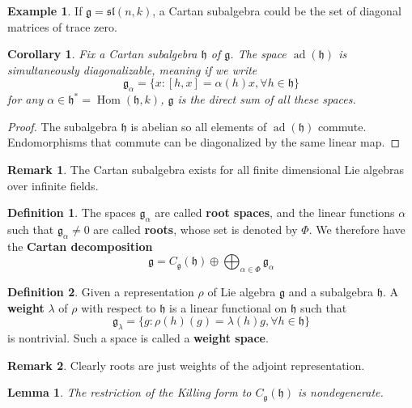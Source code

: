 \documentclass[12pt]{report}
\newtheorem{lemma}{Lemma}[section]
\newtheorem{corollary}{Corollary}[section]
\theoremstyle{remark}
\theoremstyle{definition}
\newtheorem{remark}{Remark}[section]
\newtheorem{example}{Example}[section]
\newtheorem{definition}{Definition}[section]
\newcommand{\Hom}[0]{\operatorname{Hom}}
\newcommand{\ad}{\operatorname{ad}}
\begin{document}
    \begin{example}
        If $\mathfrak g=\mathfrak{sl}(n, k)$, a Cartan subalgebra could be the set of diagonal matrices of trace zero.
    \end{example}
    \begin{corollary}
        Fix a Cartan subalgebra $\mathfrak h$ of $\mathfrak g$. The space $\ad(\mathfrak h)$ is simultaneously diagonalizable, meaning if we write 
        \[\mathfrak g_\alpha=\{x:[h, x]=\alpha(h)x,\forall h\in\mathfrak h\}\]
        for any $\alpha\in\mathfrak h^*=\Hom(\mathfrak h, k)$, $\mathfrak g$ is the direct sum of all these spaces.
    \end{corollary}
    \begin{proof}
        The subalgebra $\mathfrak h$ is abelian so all elements of $\ad(\mathfrak h)$ commute. Endomorphisms that commute can be diagonalized by the same linear map.
    \end{proof}
    \begin{remark}
        The Cartan subalgebra exists for all finite dimensional Lie algebras over infinite fields.
    \end{remark}
    \begin{definition}
        The spaces $\mathfrak g_\alpha$ are called \textbf{root spaces}, and the linear functions $\alpha$ such that $\mathfrak g_\alpha\neq 0$ are called \textbf{roots}, whose set is denoted by $\Phi$. We therefore have the \textbf{Cartan decomposition} 
        \[\mathfrak g=C_{\mathfrak g}(\mathfrak h)\oplus\bigoplus_{\alpha\in\Phi}\mathfrak g_\alpha\]
    \end{definition}
    \begin{definition}
        Given a representation $\rho$ of Lie algebra $\mathfrak g$ and a subalgebra $\mathfrak h$. A \textbf{weight} $\lambda$ of $\rho$ with respect to $\mathfrak h$ is a linear functional on $\mathfrak h$ such that
        \[\mathfrak g_\lambda=\{g:\rho(h)(g)=\lambda(h)g,\forall h\in\mathfrak h\}\]
        is nontrivial. Such a space is called a \textbf{weight space}.
    \end{definition}
    \begin{remark}
        Clearly roots are just weights of the adjoint representation.
    \end{remark}
    \begin{lemma}
        The restriction of the Killing form to $C_{\mathfrak g}(\mathfrak h)$ is nondegenerate.
    \end{lemma}
\end{document}
